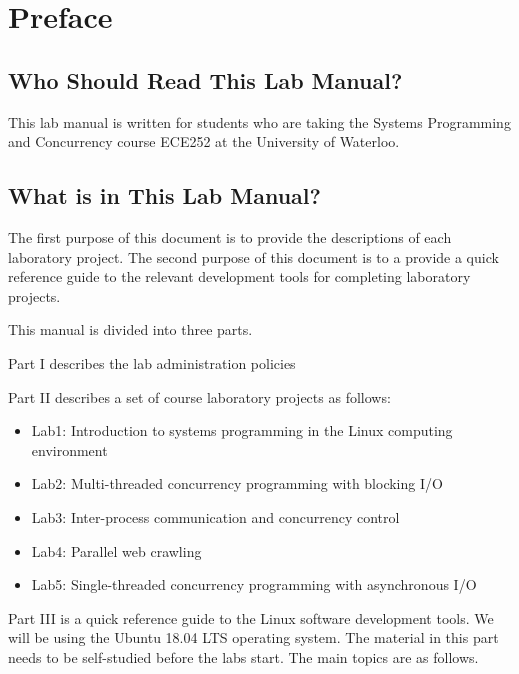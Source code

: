 \frontmatter 



\chapter{Preface}

\section*{Who Should Read This Lab Manual?}
This lab manual is written for students who are taking the Systems Programming and Concurrency course ECE252 at the University of Waterloo.

\section*{What is in This Lab Manual?}

The first purpose of this document is to provide the descriptions of each laboratory project.
The second purpose of this document is to a provide a quick reference guide to the relevant development tools 
for completing laboratory projects.

This manual is divided into three parts. 

Part I describes the lab administration policies 

Part II describes a set of course laboratory projects as follows:

\begin{itemize}
    \item Lab1: Introduction to systems programming in the Linux computing environment
    \item Lab2: Multi-threaded concurrency programming with blocking I/O
    \item Lab3: Inter-process communication and concurrency control
    \item Lab4: Parallel web crawling
    \item Lab5: Single-threaded concurrency programming with asynchronous I/O  
\end{itemize}

Part III is a quick reference guide to the Linux software development tools. We will be using the Ubuntu 18.04 LTS operating system. The material in this part needs to be self-studied before the labs start.
The main topics are as follows.

